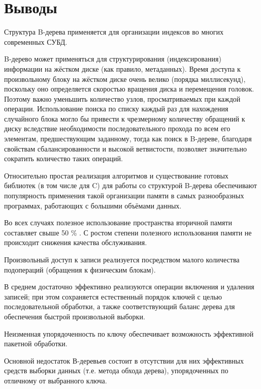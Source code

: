 \section{Выводы}

Структура B-дерева применяется для организации индексов во многих современных СУБД.

B-дерево может применяться для структурирования (индексирования) информации на жёстком диске (как правило, метаданных). Время доступа к произвольному блоку на жёстком диске очень велико (порядка миллисекунд), поскольку оно определяется скоростью вращения диска и перемещения головок. Поэтому важно уменьшить количество узлов, просматриваемых при каждой операции. Использование поиска по списку каждый раз для нахождения случайного блока могло бы привести к чрезмерному количеству обращений к диску вследствие необходимости последовательного прохода по всем его элементам, предшествующим заданному, тогда как поиск в B-дереве, благодаря свойствам сбалансированности и высокой ветвистости, позволяет значительно сократить количество таких операций.

Относительно простая реализация алгоритмов и существование готовых библиотек (в том числе для C) для работы со структурой B-дерева обеспечивают популярность применения такой организации памяти в самых разнообразных программах, работающих с большими объёмами данных.

Во всех случаях полезное использование пространства вторичной памяти составляет свыше 50 \% . С ростом степени полезного использования памяти не происходит снижения качества обслуживания.

Произвольный доступ к записи реализуется посредством малого количества подопераций (обращения к физическим блокам).

В среднем достаточно эффективно реализуются операции включения и удаления записей; при этом сохраняется естественный порядок ключей с целью последовательной обработки, а также соответствующий баланс дерева для обеспечения быстрой произвольной выборки.

Неизменная упорядоченность по ключу обеспечивает возможность эффективной пакетной обработки.

Основной недостаток В-деревьев состоит в отсутствии для них эффективных средств выборки данных (т.е. метода обхода дерева), упорядоченных по отличному от выбранного ключа.

\pagebreak